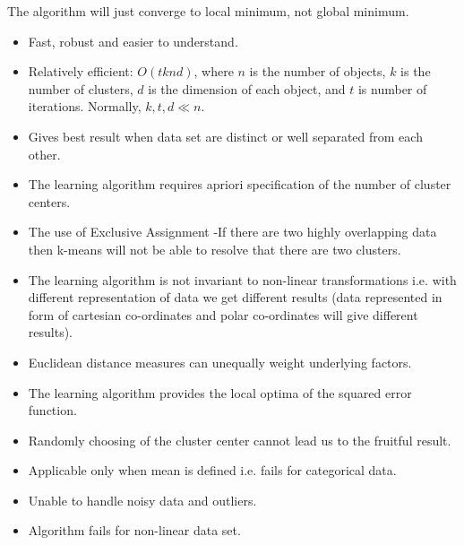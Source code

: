 \begin{refsection}
\begin{remark}
The algorithm will just converge to local minimum, not global minimum.
\end{remark}

\begin{remark}[advantages]\hfill
\begin{itemize}
	\item Fast, robust and easier to understand.
	\item  Relatively efficient: $O(tknd)$, where $n$ is the number of objects, $k$ is the number of clusters, $d$ is the dimension of each object, and $t$  is number of iterations. Normally, $k, t, d \ll n$.
\item  Gives best result when data set are distinct or well separated from each other.
\end{itemize}	
\end{remark}

\begin{remark}[disadvantages]\hfill
\begin{itemize}
	\item The learning algorithm requires apriori specification of the number of  cluster centers.
	\item The use of  Exclusive Assignment -If  there are two highly overlapping data then k-means will not be able to resolve that there are two clusters.
	\item The learning algorithm is not invariant to non-linear transformations i.e. with different representation of data we get 	different results (data represented in form of cartesian co-ordinates and polar co-ordinates will give different results).
	\item Euclidean distance measures can unequally weight underlying factors.
	\item The learning algorithm provides the local optima of the squared error function.
	\item Randomly choosing of the cluster center cannot lead us to the fruitful result.
	\item Applicable only when mean is defined i.e. fails for categorical data.
	\item Unable to handle noisy data and outliers.
	\item Algorithm fails for non-linear data set.
\end{itemize}	
\end{remark}


\end{refsection}
